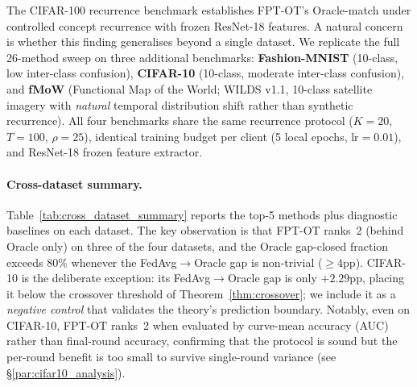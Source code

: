 The CIFAR-100 recurrence benchmark establishes FPT-OT's Oracle-match under controlled concept recurrence with frozen ResNet-18 features.
A natural concern is whether this finding generalises beyond a single dataset.
We replicate the full 26-method sweep on three additional benchmarks: \textbf{Fashion-MNIST} (10-class, low inter-class confusion), \textbf{CIFAR-10} (10-class, moderate inter-class confusion), and \textbf{fMoW} (Functional Map of the World; WILDS v1.1, 10-class satellite imagery with \emph{natural} temporal distribution shift rather than synthetic recurrence).
All four benchmarks share the same recurrence protocol ($K{=}20$, $T{=}100$, $\rho{=}25$), identical training budget per client (5 local epochs, $\textrm{lr}=0.01$), and ResNet-18 frozen feature extractor.

\paragraph{Cross-dataset summary.}
Table~\ref{tab:cross_dataset_summary} reports the top-5 methods plus diagnostic baselines on each dataset.
The key observation is that FPT-OT ranks~2 (behind Oracle only) on three of the four datasets, and the Oracle gap-closed fraction exceeds 80\% whenever the FedAvg$\to$Oracle gap is non-trivial ($\ge 4$pp).
CIFAR-10 is the deliberate exception: its FedAvg$\to$Oracle gap is only $+2.29$pp, placing it below the crossover threshold of Theorem~\ref{thm:crossover}; we include it as a \emph{negative control} that validates the theory's prediction boundary.
Notably, even on CIFAR-10, FPT-OT ranks~2 when evaluated by curve-mean accuracy (AUC) rather than final-round accuracy, confirming that the protocol is sound but the per-round benefit is too small to survive single-round variance (see \S\ref{par:cifar10_analysis}).

